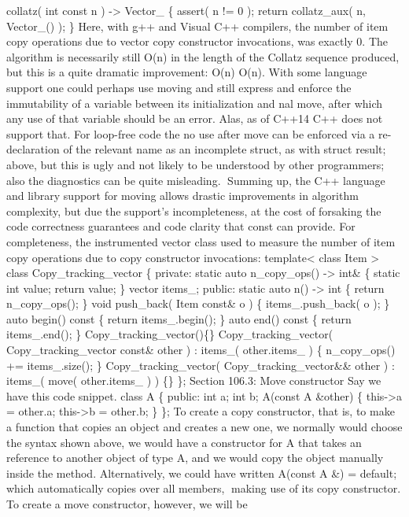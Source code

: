 collatz( int const n ) -\textgreater{} Vector\_ \{ assert( n != 0 );
return collatz\_aux( n, Vector\_() ); \} Here, with g++ and Visual C++
compilers, the number of item copy operations due to vector copy
constructor invocations, was exactly 0. The algorithm is necessarily
still O(n) in the length of the Collatz sequence produced, but this is a
quite dramatic improvement: O(n) O(n). With some language support one
could perhaps use moving and still express and enforce the immutability
of a variable between its initialization and nal move, after which any
use of that variable should be an error. Alas, as of C++14 C++ does not
support that. For loop-free code the no use after move can be enforced
via a re-declaration of the relevant name as an incomplete struct, as
with struct result; above, but this is ugly and not likely to be
understood by other programmers; also the diagnostics can be quite
misleading. Summing up, the C++ language and library support for moving
allows drastic improvements in algorithm complexity, but due the
support's incompleteness, at the cost of forsaking the code correctness
guarantees and code clarity that const can provide. For completeness,
the instrumented vector class used to measure the number of item copy
operations due to copy constructor invocations: template\textless{}
class Item \textgreater{} class Copy\_tracking\_vector \{ private:
static auto n\_copy\_ops() -\textgreater{} int\& \{ static int value;
return value; \} vector items\_; public: static auto n() -\textgreater{}
int \{ return n\_copy\_ops(); \} void push\_back( Item const\& o ) \{
items\_.push\_back( o ); \} auto begin() const \{ return
items\_.begin(); \} auto end() const \{ return items\_.end(); \}
Copy\_tracking\_vector()\{\} Copy\_tracking\_vector(
Copy\_tracking\_vector const\& other ) : items\_( other.items\_ ) \{
n\_copy\_ops() += items\_.size(); \} Copy\_tracking\_vector(
Copy\_tracking\_vector\&\& other ) : items\_( move( other.items\_ ) )
\{\} \}; Section 106.3: Move constructor Say we have this code snippet.
class A \{ public: int a; int b; A(const A \&other) \{
this-\textgreater a = other.a; this-\textgreater b = other.b; \} \}; To
create a copy constructor, that is, to make a function that copies an
object and creates a new one, we normally would choose the syntax shown
above, we would have a constructor for A that takes an reference to
another object of type A, and we would copy the object manually inside
the method. Alternatively, we could have written A(const A \&) =
default; which automatically copies over all members, making use of its
copy constructor. To create a move constructor, however, we will be
